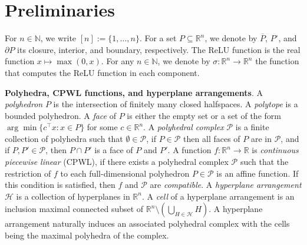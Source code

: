 \documentclass{article}
\renewcommand{\paragraph}[1]{\textbf{#1}.}
\begin{document}
\section{Preliminaries}
\label{sec:prelim}
For $n\in \mathbb{N}$, we write $[n]:=\{1,\dots, n\}$.
For a set $P\subseteq \mathbb{R}^n$, we denote by $\overline{P}$, $P^\circ$, and $\partial P$ its closure, interior, and boundary, respectively.
The ReLU function is the real function $x\mapsto \max(0,x)$.
For any $n\in \mathbb{N}$, we denote by $\sigma:\mathbb{R}^n\to \mathbb{R}^n$ the function that computes the ReLU function in each component.

\paragraph{Polyhedra, CPWL functions, and hyperplane arrangements}
A \emph{polyhedron} $P$ is the intersection of finitely many closed halfspaces.
A \emph{polytope} is a bounded polyhedron.
A \emph{face} of $P$ is either the empty set or a set of the form $\arg\min \{c^\top x: x\in P\}$ for some $c\in \mathbb{R}^n$.
A \emph{polyhedral complex} $\mathcal{P}$ is a finite collection of polyhedra such that $\emptyset \in \mathcal{P}$, if $P\in \mathcal{P}$ then all faces of $P$ are in $\mathcal{P}$, and if $P,P'\in \mathcal{P}$, then $P\cap P'$ is a face of $P$ and $P'$.
A function $f:\mathbb{R}^n\to \mathbb{R}$ is \emph{continuous piecewise linear} (CPWL), if there exists a polyhedral complex $\mathcal{P}$ such that the restriction of $f$ to each full-dimensional polyhedron $P\in \mathcal{P}$ is an affine function.
If this condition is satisfied, then $f$ and $\mathcal{P}$ are \emph{compatible}.
A \emph{hyperplane arrangement} $\mathcal{H}$ is a collection of hyperplanes in $\mathbb{R}^n$.
A \emph{cell} of a hyperplane arrangement is an inclusion maximal connected subset of $\mathbb{R}^n\setminus(\bigcup_{H\in \mathcal{H}} H)$.
A hyperplane arrangement naturally induces an associated polyhedral complex with the cells being the maximal polyhedra of the complex.
\end{document}
